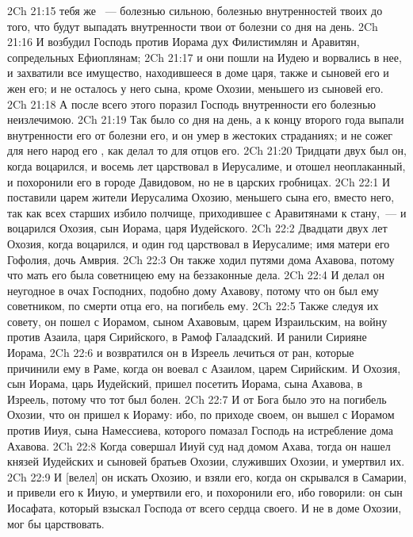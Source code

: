 \vs 2Ch 21:15 тебя же ~--- болезнью сильною, болезнью внутренностей твоих до того, что будут выпадать внутренности твои от болезни со дня на день.
\rsbpar\vs 2Ch 21:16 И возбудил Господь против Иорама дух Филистимлян и Аравитян, сопредельных Ефиоплянам;
\vs 2Ch 21:17 и они пошли на Иудею и ворвались в нее, и захватили все имущество, находившееся в доме царя, также и сыновей его и жен его; и не осталось у него сына, кроме Охозии, меньшего из сыновей его.
\vs 2Ch 21:18 А после всего этого поразил Господь внутренности его болезнью неизлечимою.
\vs 2Ch 21:19 Так было со дня на день, а к концу второго года выпали внутренности его от болезни его, и он умер в жестоких страданиях; и не сожег для него народ его , как делал то для отцов его.
\rsbpar\vs 2Ch 21:20 Тридцати двух  был он, когда воцарился, и восемь лет царствовал в Иерусалиме, и отошел неоплаканный, и похоронили его в городе Давидовом, но не в царских гробницах.
\vs 2Ch 22:1 И поставили царем жители Иерусалима Охозию, меньшего сына его, вместо него, так как всех старших избило полчище, приходившее с Аравитянами к стану,~--- и воцарился Охозия, сын Иорама, царя Иудейского.
\rsbpar\vs 2Ch 22:2 Двадцати двух лет  Охозия, когда воцарился, и один год царствовал в Иерусалиме; имя матери его Гофолия, дочь Амврия.
\vs 2Ch 22:3 Он также ходил путями дома Ахавова, потому что мать его была советницею ему на беззаконные дела.
\vs 2Ch 22:4 И делал он неугодное в очах Господних, подобно дому Ахавову, потому что он был ему советником, по смерти отца его, на погибель ему.
\vs 2Ch 22:5 Также следуя их совету, он пошел с Иорамом, сыном Ахавовым, царем Израильским, на войну против Азаила, царя Сирийского, в Рамоф Галаадский. И ранили Сирияне Иорама,
\vs 2Ch 22:6 и возвратился он в Изреель лечиться от ран, которые причинили ему в Раме, когда он воевал с Азаилом, царем Сирийским. И Охозия, сын Иорама, царь Иудейский, пришел посетить Иорама, сына Ахавова, в Изреель, потому что тот был болен.
\vs 2Ch 22:7 И от Бога было это на погибель Охозии, что он пришел к Иораму: ибо, по приходе своем, он вышел с Иорамом против Ииуя, сына Намессиева, которого помазал Господь на истребление дома Ахавова.
\vs 2Ch 22:8 Когда совершал Ииуй суд над домом Ахава, тогда он нашел князей Иудейских и сыновей братьев Охозии, служивших Охозии, и умертвил их.
\vs 2Ch 22:9 И [велел] он искать Охозию, и взяли его, когда он скрывался в Самарии, и привели его к Ииую, и умертвили его, и похоронили его, ибо говорили: он сын Иосафата, который взыскал Господа от всего сердца своего. И не  в доме Охозии,  мог бы царствовать.

